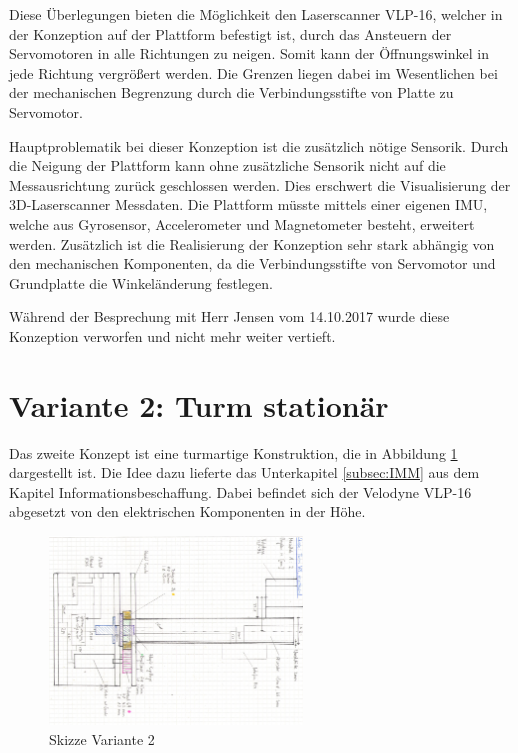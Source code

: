  Diese Überlegungen bieten die Möglichkeit den Laserscanner VLP-16, welcher in der Konzeption auf der Plattform befestigt ist, durch das Ansteuern der Servomotoren in alle Richtungen zu neigen. Somit kann der Öffnungswinkel in jede Richtung vergrößert werden. Die Grenzen liegen dabei im Wesentlichen bei der mechanischen Begrenzung durch die Verbindungsstifte von Platte zu Servomotor.
 
 Hauptproblematik bei dieser Konzeption ist die zusätzlich nötige Sensorik. Durch die Neigung der Plattform kann ohne zusätzliche Sensorik nicht auf die Messausrichtung zurück geschlossen werden. Dies erschwert die Visualisierung der 3D-Laserscanner Messdaten. Die Plattform müsste mittels einer eigenen \ac{IMU}, welche aus Gyrosensor, Accelerometer und Magnetometer besteht, erweitert werden. Zusätzlich ist die Realisierung der Konzeption sehr stark abhängig von den mechanischen Komponenten, da die Verbindungsstifte von Servomotor und Grundplatte die Winkeländerung festlegen.
 
 Während der Besprechung mit Herr Jensen vom 14.10.2017 wurde diese Konzeption verworfen und nicht mehr weiter vertieft.
 
\section {Variante 2: Turm stationär}
\label{sec:var2}
Das zweite Konzept ist eine turmartige Konstruktion, die in Abbildung \ref{fig:skizze_unrotierend} dargestellt ist. Die Idee dazu lieferte das Unterkapitel \ref{subsec:IMM} aus dem Kapitel Informationsbeschaffung. Dabei befindet sich der Velodyne VLP-16 abgesetzt von den elektrischen Komponenten in der Höhe.

\begin{figure}[H]
	\centering
	\includegraphics[angle=90,width=0.6\textwidth]{resources/skizze_unrotierend.PNG}
	\caption[Skizze Varainte 2]{Skizze Variante 2 }
	\label{fig:skizze_unrotierend}
\end{figure} 


